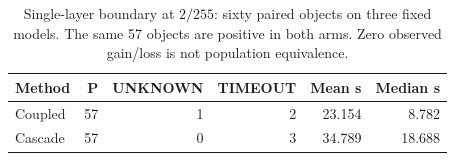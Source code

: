 \begin{table}[ht]
\centering\small
\caption{Single-layer boundary at $2/255$: sixty paired objects on three fixed models. The same 57 objects are positive in both arms. Zero observed gain/loss is not population equivalence.}
\label{tab:boundary}
\begin{tabular}{lrrrrr}
\toprule
Method & P & UNKNOWN & TIMEOUT & Mean s & Median s \\
\midrule
Coupled & 57 & 1 & 2 & 23.154 & 8.782 \\
Cascade & 57 & 0 & 3 & 34.789 & 18.688 \\
\bottomrule
\end{tabular}
\end{table}
